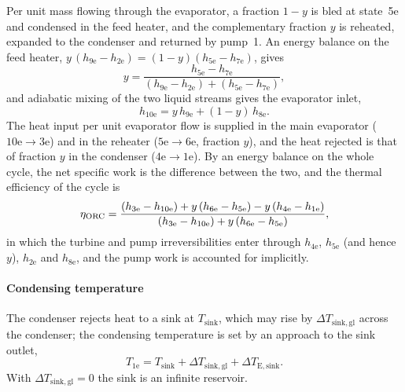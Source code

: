 Per unit mass flowing through the evaporator, a fraction $1-y$ is bled at
state~5e and condensed in the feed heater, and the complementary fraction $y$
is reheated, expanded to the condenser and returned by pump~1. An energy
balance on the feed heater, $y\,(h_\mathrm{9e}-h_\mathrm{2e})
=(1-y)(h_\mathrm{5e}-h_\mathrm{7e})$, gives
\begin{equation}
  y=\frac{h_\mathrm{5e}-h_\mathrm{7e}}
         {\left(h_\mathrm{9e}-h_\mathrm{2e}\right)
          +\left(h_\mathrm{5e}-h_\mathrm{7e}\right)},
  \label{eq:orc-y}
\end{equation}
and adiabatic mixing of the two liquid streams gives the evaporator inlet,
\begin{equation}
  h_\mathrm{10e}=y\,h_\mathrm{9e}+(1-y)\,h_\mathrm{8e}.
  \label{eq:orc-h10}
\end{equation}
The heat input per unit evaporator flow is supplied in the main evaporator
($\mathrm{10e}\to\mathrm{3e}$) and in the reheater
($\mathrm{5e}\to\mathrm{6e}$, fraction $y$), and the heat rejected is that of
fraction $y$ in the condenser ($\mathrm{4e}\to\mathrm{1e}$). By an energy
balance on the whole cycle, the net specific work is the difference between the
two, and the thermal efficiency of the cycle is
\begin{equation}
  \eta_{\mathrm{ORC}}=\frac{\left(h_\mathrm{3e}-h_\mathrm{10e}\right)
     +y\left(h_\mathrm{6e}-h_\mathrm{5e}\right)
     -y\left(h_\mathrm{4e}-h_\mathrm{1e}\right)}
    {\left(h_\mathrm{3e}-h_\mathrm{10e}\right)
     +y\left(h_\mathrm{6e}-h_\mathrm{5e}\right)},
  \label{eq:eta-orc}
\end{equation}
in which the turbine and pump irreversibilities enter through
$h_\mathrm{4e}$, $h_\mathrm{5e}$ (and hence $y$), $h_\mathrm{2e}$ and
$h_\mathrm{8e}$, and the pump work is accounted for implicitly.

\paragraph{Condensing temperature} The condenser rejects heat to a sink at
$T_\mathrm{sink}$, which may rise by $\Delta T_\mathrm{sink,gl}$ across the
condenser; the condensing temperature is set by an approach to the sink
outlet,
\begin{equation}
  T_\mathrm{1e}=T_\mathrm{sink}+\Delta T_\mathrm{sink,gl}+\Delta T_\mathrm{E,sink}.
  \label{eq:T1e}
\end{equation}
With $\Delta T_\mathrm{sink,gl}=0$ the sink is an infinite reservoir.


